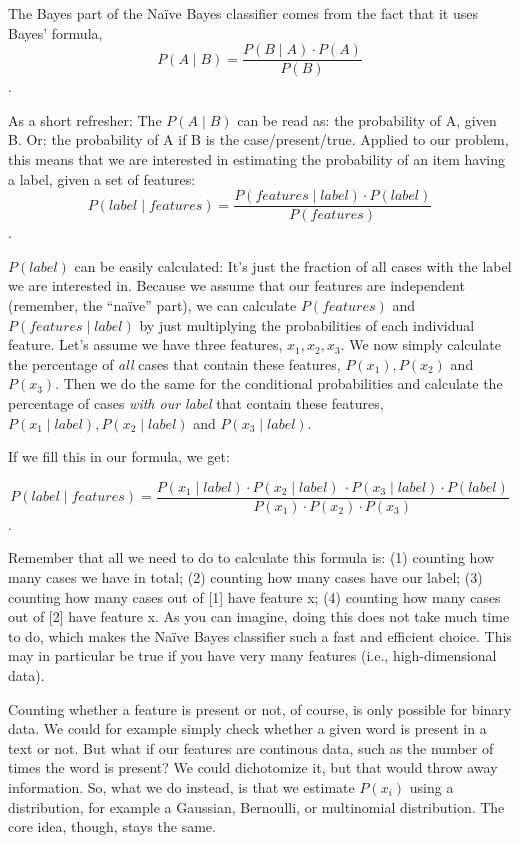 The Bayes part of the Na\"ive Bayes classifier comes from the fact
that it uses Bayes' formula, $$ P(A \mid B) = \frac{P(B \mid A) \cdot P(A)}{P(B)} $$.

As a short refresher: The $P(A \mid B)$ can be read as: the
probability of A, given B. Or: the probability of A if B is the
case/present/true.  Applied to our problem, this means that we are
interested in estimating the probability of an item having a label,
given a set of features:
$$ P(label \mid features) = \frac{P(features \mid label) \cdot P(label)}{P(features)} $$.

$P(label)$ can be easily calculated: It's just the fraction of all
cases with the label we are interested in.  Because we assume that our
features are independent (remember, the ``na\"ive'' part), we can
calculate $P(features)$ and $P(features\mid label)$ by just
multiplying the probabilities of each individual feature.  Let's
assume we have three features, $x_1, x_2, x_3$.  We now simply
calculate the percentage of \emph{all} cases that contain these
features, $P(x_1), P(x_2)$ and $P(x_3)$.  Then we do the same for the
conditional probabilities and calculate the percentage of cases
\emph{with our label} that contain these features, $P(x_1\mid label),
P(x_2\mid label)$ and $P(x_3\mid label)$.

If we fill this in our formula, we get:


$$ P(label \mid features) = \frac{P(x_1 \mid label) \cdot P(x_2 \mid label)\ \cdot P(x_3 \mid label) \cdot P(label)}{P(x_1) \cdot P(x_2) \cdot P(x_3)}$$.

Remember that all we need to do to calculate this formula is: (1)
counting how many cases we have in total; (2) counting how many cases
have our label; (3) counting how many cases out of [1] have feature x;
(4) counting how many cases out of [2] have feature x.  As you can
imagine, doing this does not take much time to do, which makes the
Na\"ive Bayes classifier such a fast and efficient choice.  This may
in particular be true if you have very many features (i.e.,
high-dimensional data).

Counting whether a feature is present or not, of course, is only
possible for binary data. We could for example simply check whether a
given word is present in a text or not.  But what if our features are
continous data, such as the number of times the word is present?  We
could dichotomize it, but that would throw away information.  So, what
we do instead, is that we estimate $P(x_i)$ using a distribution, for
example a Gaussian, Bernoulli, or multinomial distribution. The core
idea, though, stays the same.

